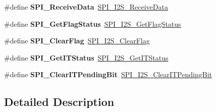 \begin{DoxyCompactItemize}
\#define {\bfseries S\+P\+I\+\_\+\+Receive\+Data}~\mbox{\hyperlink{group___s_p_i_gab77de76547f3bff403236b263b070a30}{S\+P\+I\+\_\+\+I2\+S\+\_\+\+Receive\+Data}}
\item 
\mbox{\label{group___s_p_i___i2_s___legacy_ga188075bf183b67201651e20b227fe7a7}} 
\#define {\bfseries S\+P\+I\+\_\+\+Get\+Flag\+Status}~\mbox{\hyperlink{group___s_p_i_ga1bd785d129e09c5734a876c8f2767204}{S\+P\+I\+\_\+\+I2\+S\+\_\+\+Get\+Flag\+Status}}
\item 
\mbox{\label{group___s_p_i___i2_s___legacy_ga9fde1f0c2f8d9f5690fe3d058d16ed5c}} 
\#define {\bfseries S\+P\+I\+\_\+\+Clear\+Flag}~\mbox{\hyperlink{group___s_p_i_ga3aabd9e2437e213056c0ed9bdfa1a724}{S\+P\+I\+\_\+\+I2\+S\+\_\+\+Clear\+Flag}}
\item 
\mbox{\label{group___s_p_i___i2_s___legacy_ga4ebfa18a880b0eec4142e74cad021dd9}} 
\#define {\bfseries S\+P\+I\+\_\+\+Get\+I\+T\+Status}~\mbox{\hyperlink{group___s_p_i_ga72decbc1cd79f8fad92a2204beca6bc5}{S\+P\+I\+\_\+\+I2\+S\+\_\+\+Get\+I\+T\+Status}}
\item 
\mbox{\label{group___s_p_i___i2_s___legacy_gab5f0a306ab6c4dc0775314f367fe935e}} 
\#define {\bfseries S\+P\+I\+\_\+\+Clear\+I\+T\+Pending\+Bit}~\mbox{\hyperlink{group___s_p_i_ga35a524a49ff3d058137060f751e8749f}{S\+P\+I\+\_\+\+I2\+S\+\_\+\+Clear\+I\+T\+Pending\+Bit}}
\end{DoxyCompactItemize}


\subsection{Detailed Description}

